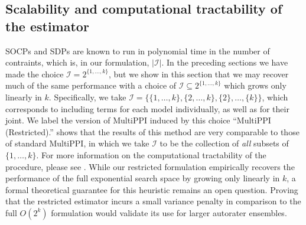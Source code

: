 \documentclass{article} %
\begin{document}
\subsection{Scalability and computational tractability of the estimator}\label{sec:restricted}
SOCPs and SDPs are known to run in polynomial time in the number of contraints, which is, in our formulation, $|\mathcal{I}|$. In the preceding sections we have made the choice $\mathcal{I}=2^{\{1,\dots,k\}}$, but we show in this section that we may recover much of the same performance with a choice of $\mathcal{I}\subseteq 2^{\{1,\dots,k\}}$ which grows only linearly in $k$. Specifically, we take $\mathcal{I}=\{\{1,\dots,k\},\{2,\dots,k\},\{2\},\dots,\{k\}\}$, which corresponds to including terms for each model individually, as well as for their joint. We label the version of MultiPPI induced by this choice ``MultiPPI (Restricted).''  shows that the results of this method are very comparable to those of standard MultiPPI, in which we take $\mathcal{I}$ to be the collection of \textit{all} subsets of $\{1,\dots,k\}$. For more information on the computational tractability of the procedure, please see . While our restricted formulation empirically recovers the performance of the full exponential search space by growing only linearly in $k$, a formal theoretical guarantee for this heuristic remains an open question. Proving that the restricted estimator incurs a small variance penalty in comparison to the full $O(2^k)$ formulation would validate its use for larger autorater ensembles.
\end{document}
